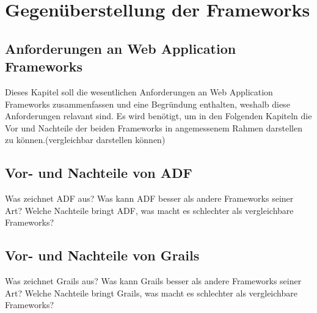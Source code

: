 \section{Gegenüberstellung der Frameworks}
\subsection{Anforderungen an Web Application Frameworks}
Dieses Kapitel soll die wesentlichen Anforderungen an Web Application Frameworks zusammenfassen und eine Begründung enthalten, weshalb diese Anforderungen relavant sind. Es wird benötigt, um in den Folgenden Kapiteln die Vor und Nachteile der beiden Frameworks in angemessenem Rahmen darstellen zu können.(vergleichbar darstellen können)
\subsection{Vor- und Nachteile von ADF}
Was zeichnet ADF aus? Was kann ADF besser als andere Frameworks seiner Art?
Welche Nachteile bringt ADF, was macht es schlechter als vergleichbare Frameworks?
\subsection{Vor- und Nachteile von Grails}
Was zeichnet Grails aus? Was kann Grails besser als andere Frameworks seiner Art?
Welche Nachteile bringt Grails, was macht es schlechter als vergleichbare Frameworks?
